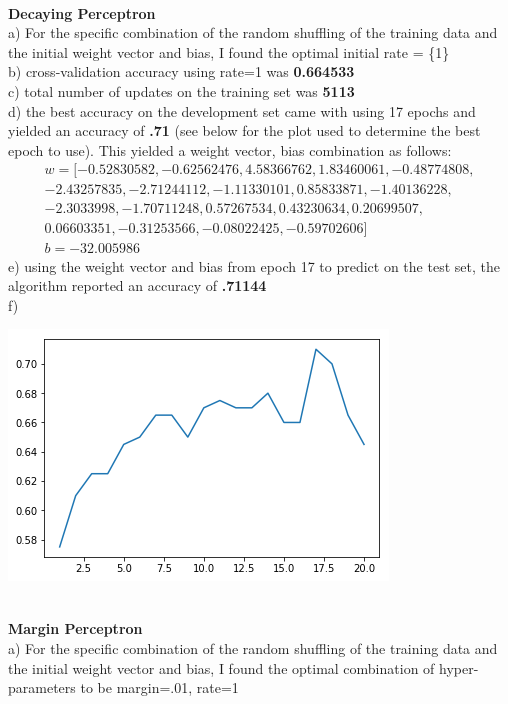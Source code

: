 \documentclass[11pt,a4paper]{article}
\begin{document}
\begin{enumerate}
\begin{center}
			\end{center}
			\\
			\textbf{Decaying Perceptron}    \\
			a) For the specific combination of the random shuffling of the training data and the initial weight vector and bias, I found the optimal initial rate = \{1\}  \\
			b) cross-validation accuracy using rate=1 was \textbf{0.664533}\\
			c) total number of updates on the training set was \textbf{5113}\\
			d) the best accuracy on the development set came with using 17 epochs and yielded an accuracy of \textbf{.71} (see below for the plot used to determine the best epoch to use). This yielded a weight vector, bias combination as follows:\\
			\begin{gather}
			w = [-0.52830582, -0.62562476,  4.58366762,  1.83460061, -0.48774808,\\
			-2.43257835, -2.71244112, -1.11330101,  0.85833871, -1.40136228,\\
			-2.3033998 , -1.70711248,  0.57267534,  0.43230634,  0.20699507,\\
			0.06603351, -0.31253566, -0.08022425, -0.59702606] \\
			b = -32.005986
			\end{gather}
			e) using the weight vector and bias from epoch 17 to predict on the test set, the algorithm reported an accuracy of \textbf{.71144} \\
			f)
			\begin{center}
				\includegraphics[width=0.7\linewidth]{decaying_plot}
			\end{center}
			\\
			\textbf{Margin Perceptron}    \\
			a) For the specific combination of the random shuffling of the training data and the initial weight vector and bias, I found the optimal combination of hyper-parameters to be margin=.01, rate=1  \\

\end{enumerate}
\end{document}
